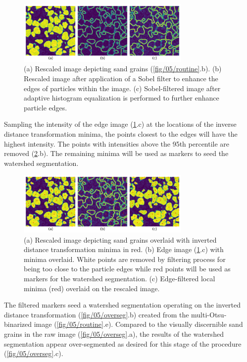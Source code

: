 \begin{figure}[ht]
    \centering
    \includegraphics[width=0.75\textwidth]{figures/05/04-edges.png}
    \caption{
        \small{}
        (a) Rescaled image depicting sand grains
        (\ref{fig/05/routine}.b).
        (b) Rescaled image after application of a Sobel filter to enhance the
        edges of particles within the image.
        (c) Sobel-filtered image after adaptive histogram equalization is
        performed to further enhance particle edges.
    }
    \label{fig/05/edges}
\end{figure}

Sampling the intensity of the edge image (\ref{fig/05/edges}.c) at
the locations of
the inverse distance transformation minima, the points closest to the
edges will have the highest intensity. The points with intensities above
the 95th percentile are removed (\ref{fig/05/seeds}.b). The remaining
minima will be used as markers to seed the watershed segmentation.

\begin{figure}[ht]
    \centering
    \includegraphics[width=0.75\textwidth]{figures/05/05-seeds.png}
    \caption{
        \small{}
        (a) Rescaled image depicting sand grains overlaid with
        inverted distance transformation minima in red.
        (b) Edge image (\ref{fig/05/edges}.c) with minima overlaid.
        White points are removed by filtering process for being too close
        to the particle edges while red points will be used as markers for
        the watershed segmentation.
        (c) Edge-filtered local minima (red) overlaid on the rescaled image.
    }
    \label{fig/05/seeds}
\end{figure}

The filtered markers seed a watershed segmentation operating on the
inverted distance transformation (\ref{fig/05/overseg}.b) created from
the multi-Otsu-binarized image (\ref{fig/05/routine}.e). Compared to the
visually discernible sand grains in the raw image (\ref{fig/05/overseg}.a),
the results of the watershed segmentation appear over-segmented as desired for
this stage of the procedure (\ref{fig/05/overseg}.c).

